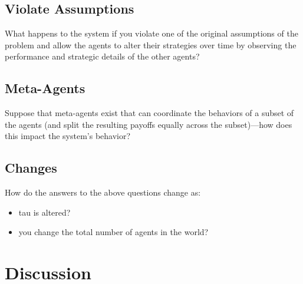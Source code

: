 \documentclass[]{article}
\begin{document}
\subsection{Violate Assumptions}What happens to the system if you violate one of the original assumptions of the problem and allow the agents to alter their strategies over time by observing the performance and strategic details of the other agents?
\subsection{Meta-Agents}Suppose that meta-agents exist that can coordinate the behaviors of a subset of the agents (and split the resulting payoffs equally across the subset)---how does this impact the system's behavior?
\subsection{Changes}How do the answers to the above questions change as:
\begin{itemize}
	\item tau is altered?
	\item you change the total number of agents in the world?
\end{itemize}

\section{Discussion}

\medskip



\end{document}
